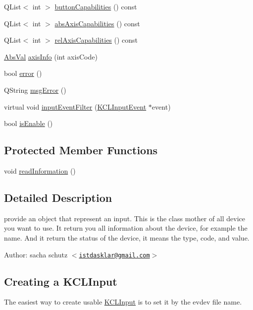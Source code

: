 \begin{CompactItemize}
\item 
QList$<$ int $>$ \hyperlink{class_k_c_l_input_34ef86b5dca6991de90743a5c20d8c38}{buttonCapabilities} () const 
\item 
QList$<$ int $>$ \hyperlink{class_k_c_l_input_98e8b6035165b8ba1d2eed1620cf1b1c}{absAxisCapabilities} () const 
\item 
QList$<$ int $>$ \hyperlink{class_k_c_l_input_01591a1897e2b8a62b305470ac673fd5}{relAxisCapabilities} () const 
\item 
\hyperlink{class_abs_val}{AbsVal} \hyperlink{class_k_c_l_input_fa50617f76c29a376c615f5420ea3152}{axisInfo} (int axisCode)
\item 
bool \hyperlink{class_k_c_l_input_0c3b7dd3cce5d5567c4894500074fee3}{error} ()
\item 
QString \hyperlink{class_k_c_l_input_90dc7de6adce9a4eeda72d57491137f3}{msgError} ()
\item 
virtual void \hyperlink{class_k_c_l_input_ee93fa33ec6a14baf2acf3daf23607c0}{inputEventFilter} (\hyperlink{class_k_c_l_input_event}{KCLInputEvent} $\ast$event)
\item 
bool \hyperlink{class_k_c_l_input_fcc85277197831a8dae75178b90bfebb}{isEnable} ()
\end{CompactItemize}
\subsection*{Protected Member Functions}
\begin{CompactItemize}
\item 
void \hyperlink{class_k_c_l_input_33e1fd26c084040a728cabf03e445893}{readInformation} ()
\end{CompactItemize}


\subsection{Detailed Description}
provide an object that represent an input. This is the class mother of all device you want to use. It return you all information about the device, for example the name. And it return the status of the device, it means the type, code, and value. 

\begin{Desc}
\item[Author:]sacha schutz $<$\href{mailto:istdasklar@gmail.com}{\tt istdasklar@gmail.com}$>$\end{Desc}
\hypertarget{class_k_c_l_input_creating}{}\subsection{Creating a KCLInput}\label{class_k_c_l_input_creating}
The easiest way to create usable \hyperlink{class_k_c_l_input}{KCLInput} is to set it by the evdev file name. 

